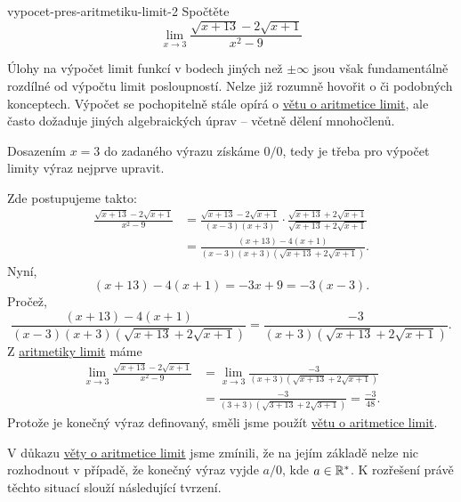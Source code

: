 \begin{problem}{}{vypocet-pres-aritmetiku-limit-2}
 Spočtěte
 \[
  \lim_{x \to 3} \frac{\sqrt{x+13} - 2 \sqrt{x+1}}{x^2 - 9}
 \]
\end{problem}
\begin{probsol}
 Úlohy na výpočet limit funkcí v bodech jiných než $ \pm \infty$ jsou však
 fundamentálně rozdílné od výpočtu limit posloupností. Nelze již rozumně hovořit
 o  či podobných konceptech. Výpočet se
 pochopitelně stále opírá o \hyperref[thm:aritmetika-limit-funkci]{větu o
 aritmetice limit}, ale často dožaduje jiných algebraických úprav -- včetně
 dělení mnohočlenů.

 Dosazením $x = 3$ do zadaného výrazu získáme $0 / 0$, tedy je třeba pro výpočet
 limity výraz nejprve upravit.

 Zde postupujeme takto:
 \begin{align*}
  \frac{\sqrt{x + 13} - 2 \sqrt{x+1}}{x^2 - 9} &= \frac{\sqrt{x+13} - 2
  \sqrt{x+1}}{(x-3)(x+3)} \cdot \frac{\sqrt{x+13} + 2 \sqrt{x+1}}{\sqrt{x + 13}
 	+ 2 \sqrt{x+1}}\\
 																							 &= \frac{(x+13) -
 																							 4(x+1)}{(x-3)(x+3)(\sqrt{x+13} +
 																							 2 \sqrt{x+1})}.
 \end{align*}
 Nyní,
 \[
  (x + 13) - 4(x + 1) = -3x + 9 = -3(x-3).
 \]
 Pročež,
 \[
 	\frac{(x + 13) - 4(x + 1)}{(x-3)(x+3)(\sqrt{x+13} + 2 \sqrt{x+1})} =
 	\frac{-3}{(x+3)(\sqrt{x+13} + 2 \sqrt{x+1})}.
 \]
 Z \hyperref[thm:aritmetika-limit-funkci]{aritmetiky limit} máme
 \begin{align*}
  \lim_{x \to 3} \frac{\sqrt{x+13} - 2 \sqrt{x+1}}{x^2 - 9} &= \lim_{x \to 3}
  \frac{-3}{(x+3)(\sqrt{x+13} + 2 \sqrt{x+1})}\\
  																													&= \frac{-3}{(3 +
  																													3)(\sqrt{3 + 13} + 2
  																												 \sqrt{3 + 1})} =
  																												 \frac{-3}{48}.
 \end{align*}
 Protože je konečný výraz definovaný, směli jsme použít
 \hyperref[thm:aritmetika-limit-funkci]{větu o aritmetice limit}.
\end{probsol}

V důkazu \hyperref[thm:aritmetika-limit-funkci]{věty o aritmetice limit} jsme
zmínili, že na jejím základě nelze nic rozhodnout v případě, že konečný výraz
vyjde $a / 0$, kde $a \in \mathbb{R}^{*}$. K rozřešení právě těchto situací slouží
následující tvrzení.

